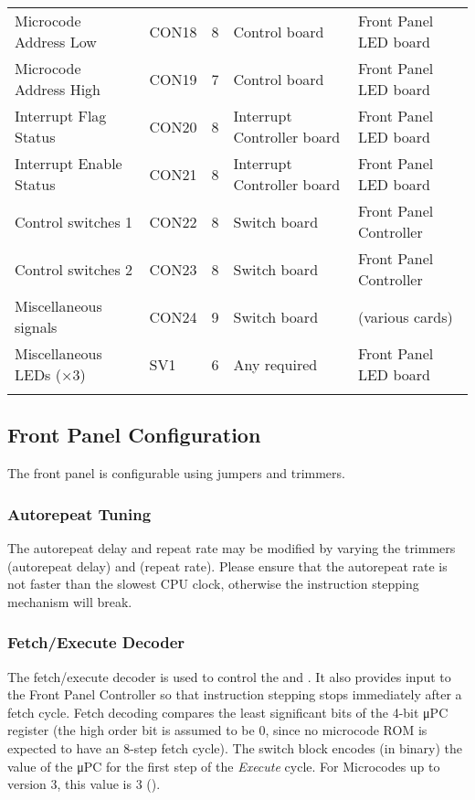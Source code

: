 \begin{table}[tb]
\begin{tabular}{llcll}
    Microcode Address Low    & CON18 & 8 & Control board & Front Panel LED board \\
    Microcode Address High   & CON19 & 7 & Control board & Front Panel LED board \\
    Interrupt Flag Status    & CON20 & 8 & Interrupt Controller board & Front Panel LED board \\
    Interrupt Enable Status  & CON21 & 8 & Interrupt Controller board & Front Panel LED board \\
    Control switches 1       & CON22 & 8 & Switch board & Front Panel Controller \\
    Control switches 2       & CON23 & 8 & Switch board & Front Panel Controller \\
    Miscellaneous signals    & CON24 & 9 & Switch board & (various cards) \\
    Miscellaneous LEDs (×3)  & SV1   & 6 & Any required & Front Panel LED board \\
    \noalign{\smallskip}\hline\noalign{\smallskip}
  \end{tabular}
\end{table}

\subsection{Front Panel Configuration}

The front panel is configurable using jumpers and trimmers.

\subsubsection{ Autorepeat Tuning}

The autorepeat delay and repeat rate may be modified by varying the
trimmers  (autorepeat delay) and  (repeat
rate). Please ensure that the autorepeat rate is not faster than the
slowest CPU clock, otherwise the instruction stepping mechanism will
break.

\subsubsection{Fetch/Execute Decoder}

The fetch/execute decoder is used to control the  and
. It also provides input to the Front Panel Controller so
that instruction stepping stops immediately after a fetch cycle. Fetch
decoding compares the least significant bits of the 4-bit μPC register
(the high order bit is assumed to be 0, since no microcode ROM is
expected to have an 8-step fetch cycle). The  switch block
 encodes (in binary) the value of the μPC for the first
step of the {\em Execute\/} cycle. For Microcodes up to version 3,
this value is 3 ().


